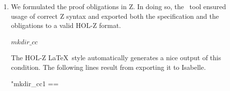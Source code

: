 \begin{enumerate}
\item We formulated the proof obligations in Z. In doing so, the \Zeta~tool
  ensured usage of correct Z syntax and exported both the specification and the
  obligations to a valid HOL-Z format.
%
%
  \begin{center}
\begin{minipage}{.9\linewidth }
\ensuremath{mkdir\_cc}
\end{minipage}
\end{center}
The HOL-Z \LaTeX\ style automatically generates a nice output of this condition. The following lines result from exporting it to Isabelle.
%
\begin{holzverb}
"mkdir_cc1 ==


\end{holzverb}
\end{enumerate}
